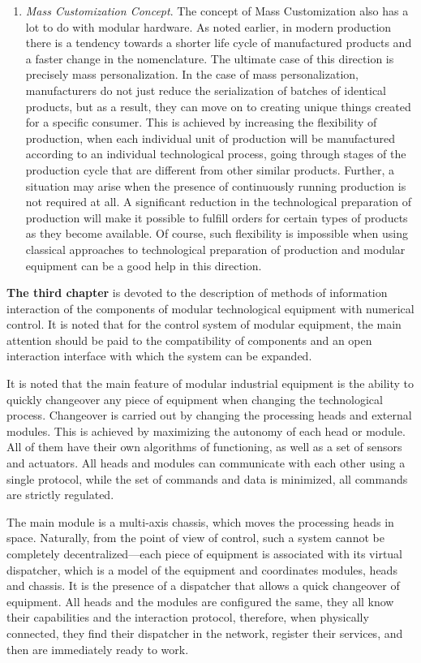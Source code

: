 \begin{enumerate}
	\item\textit{Mass Customization Concept}. The concept of Mass Customization also has a lot to do with modular hardware. As noted earlier, in modern production there is a tendency towards a shorter life cycle of manufactured products and a faster change in the nomenclature. The ultimate case of this direction is precisely mass personalization. In the case of mass personalization, manufacturers do not just reduce the serialization of batches of identical products, but as a result, they can move on to creating unique things created for a specific consumer. This is achieved by increasing the flexibility of production, when each individual unit of production will be manufactured according to an individual technological process, going through stages of the production cycle that are different from other similar products. Further, a situation may arise when the presence of continuously running production is not required at all. A significant reduction in the technological preparation of production will make it possible to fulfill orders for certain types of products as they become available. Of course, such flexibility is impossible when using classical approaches to technological preparation of production and modular equipment can be a good help in this direction.
\end{enumerate}


\textbf{The third chapter} is devoted to the description of methods of information interaction of the components of modular technological equipment with numerical control. It is noted that for the control system of modular equipment, the main attention should be paid to the compatibility of components and an open interaction interface with which the system can be expanded.

It is noted that the main feature of modular industrial equipment is the ability to quickly changeover any piece of equipment when changing the technological process. Changeover is carried out by changing the processing heads and external modules. This is achieved by maximizing the autonomy of each head or module. All of them have their own algorithms of functioning, as well as a set of sensors and actuators. All heads and modules can communicate with each other using a single protocol, while the set of commands and data is minimized, all commands are strictly regulated.

The main module is a multi-axis chassis, which moves the processing heads in space. Naturally, from the point of view of control, such a system cannot be completely decentralized---each piece of equipment is associated with its virtual dispatcher, which is a model of the equipment and coordinates modules, heads and chassis. It is the presence of a dispatcher that allows a quick changeover of equipment. All heads and the modules are configured the same, they all know their capabilities and the interaction protocol, therefore, when physically connected, they find their dispatcher in the network, register their services, and then are immediately ready to work.

